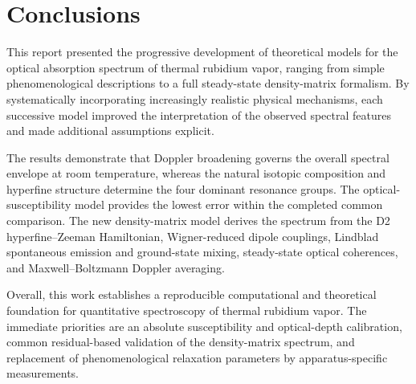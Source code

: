 \documentclass[11pt]{article}
\numberwithin{equation}{section}
\begin{document}
\clearpage
\section{Conclusions}

This report presented the progressive development of theoretical models for the optical absorption spectrum of thermal rubidium vapor, ranging from simple phenomenological descriptions to a full steady-state density-matrix formalism. By systematically incorporating increasingly realistic physical mechanisms, each successive model improved the interpretation of the observed spectral features and made additional assumptions explicit.

The results demonstrate that Doppler broadening governs the overall spectral envelope at room temperature, whereas the natural isotopic composition and hyperfine structure determine the four dominant resonance groups. The optical-susceptibility model provides the lowest error within the completed common comparison. The new density-matrix model derives the spectrum from the D2 hyperfine--Zeeman Hamiltonian, Wigner-reduced dipole couplings, Lindblad spontaneous emission and ground-state mixing, steady-state optical coherences, and Maxwell--Boltzmann Doppler averaging.

Overall, this work establishes a reproducible computational and theoretical foundation for quantitative spectroscopy of thermal rubidium vapor. The immediate priorities are an absolute susceptibility and optical-depth calibration, common residual-based validation of the density-matrix spectrum, and replacement of phenomenological relaxation parameters by apparatus-specific measurements.


\clearpage



\end{document}
